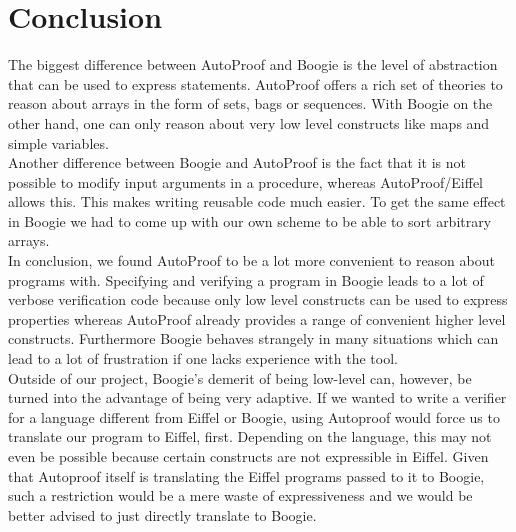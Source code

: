 \section{Conclusion}
\label{sec:conclusion}
The biggest difference between AutoProof and Boogie is the level of abstraction that can be 
used to express statements. AutoProof offers a rich set of theories to reason about arrays in the
form of sets, bags or sequences. With Boogie on the other hand, one can only reason about very 
low level constructs like maps and simple variables.\\

Another difference between Boogie and AutoProof is the fact that it is not possible to modify
input arguments in a procedure, whereas AutoProof/Eiffel allows this. This makes writing reusable code
much easier. To get the same effect in Boogie we had to come up with our own scheme to be able to sort arbitrary arrays.\\

In conclusion, we found AutoProof to be a lot more convenient to reason about programs with. Specifying and verifying a program in Boogie leads to a lot of verbose verification code because only low level constructs can be used to express properties whereas AutoProof already provides a range of convenient higher level constructs. 
Furthermore Boogie behaves strangely in many situations which can lead to a lot of frustration if one lacks experience with the tool.\\

Outside of our project, Boogie's demerit of being low-level can, however, be turned into the advantage of being very adaptive. If we wanted to write a verifier for a language different from Eiffel or Boogie, using Autoproof would force us to translate our program to Eiffel, first. Depending on the language, this may not even be possible because certain constructs are not expressible in Eiffel. Given that Autoproof itself is translating the Eiffel programs passed to it to Boogie\cite{autoproofPaper}, such a restriction would be a mere waste of expressiveness and we would be better advised to just directly translate to Boogie.\\

